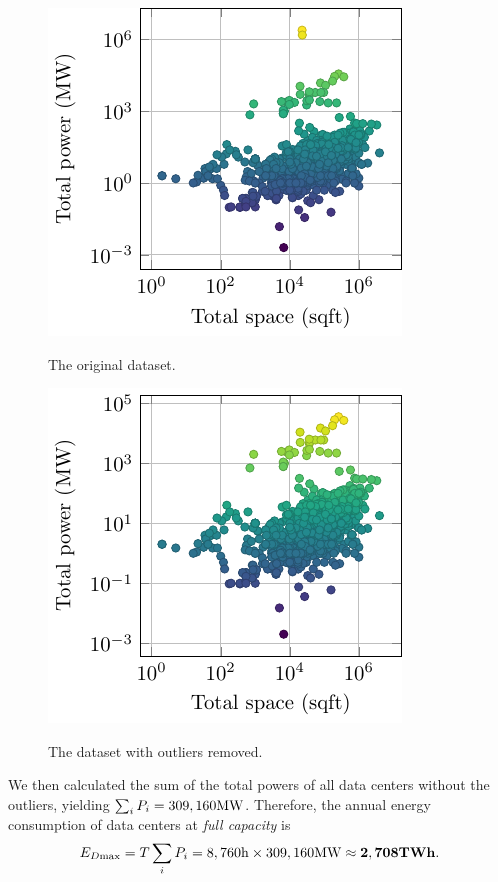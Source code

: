 \documentclass[12pt]{article}
\begin{document}
\begin{figure}[!t]
	\centering
	\begin{minipage}{0.48\textwidth}
		\centering
		\label{fig_data_datacenters_original}
		\includegraphics{figures/data/datacenters.pdf}
		\caption{The original dataset.}
	\end{minipage}
	\begin{minipage}{0.48\textwidth}
		\centering
		\label{fig_data_datacenters_clean}
		\includegraphics{figures/data/datacenters_clean.pdf}
		\caption{The dataset with outliers removed.}
	\end{minipage}
\end{figure}

We then calculated the sum of the total powers of all data centers without the outliers, yielding $\sum_i P_i = 309,160 \rm MW$. Therefore, the annual energy consumption of data centers at \textit{full capacity} is
\begin{equation}
	E_{D \rm max} = T \sum_i P_i =
	\rm 8,760h \times 309,160MW \approx \mathbf{2,708TWh}.
\end{equation}
\end{document}
